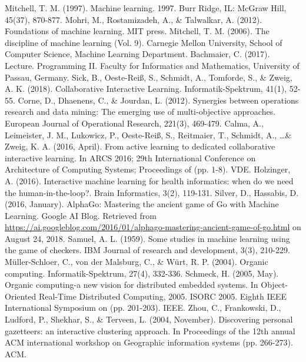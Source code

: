 \documentclass[conference]{IEEEtran}
\begin{document}
\begin{thebibliography}{1}
    Mitchell, T. M. (1997). Machine learning. 1997. Burr Ridge, IL: McGraw Hill, 45(37), 870-877.
    Mohri, M., Rostamizadeh, A., \& Talwalkar, A. (2012). Foundations of machine learning. MIT press.
    Mitchell, T. M. (2006). The discipline of machine learning (Vol. 9). Carnegie Mellon University, School of Computer Science, Machine Learning Department.
    Bachmaier, C. (2017). Lecture. Programming II\@. Faculty for Informatics and Mathematics, University of Passau, Germany.
    Sick, B., Oeste-Rei{\ss}, S., Schmidt, A., Tomforde, S., \& Zweig, A. K. (2018). Collaborative Interactive Learning. Informatik-Spektrum, 41(1), 52-55.
    Corne, D., Dhaenens, C., \& Jourdan, L. (2012). Synergies between operations research and data mining: The emerging use of multi-objective approaches. European Journal of Operational Research, 221(3), 469-479.
    Calma, A., Leimeister, J. M., Lukowicz, P., Oeste-Rei{\ss}, S., Reitmaier, T., Schmidt, A., \dots \& Zweig, K. A. (2016, April). From active learning to dedicated collaborative interactive learning. In ARCS 2016; 29th International Conference on Architecture of Computing Systems; Proceedings of (pp. 1-8). VDE.
    Holzinger, A. (2016). Interactive machine learning for health informatics: when do we need the human-in-the-loop?. Brain Informatics, 3(2), 119-131.
    Silver, D., Hassabis, D. (2016, January). AlphaGo: Mastering the ancient game of Go with Machine Learning. Google AI Blog. Retrieved from \url{https://ai.googleblog.com/2016/01/alphago-mastering-ancient-game-of-go.html} on August 24, 2018. 
    Samuel, A. L. (1959). Some studies in machine learning using the game of checkers. IBM Journal of research and development, 3(3), 210-229.
    M{\"u}ller-Schloer, C., von der Malsburg, C., \& W{\"u}rt, R. P. (2004). Organic computing. Informatik-Spektrum, 27(4), 332-336.
    Schmeck, H. (2005, May). Organic computing-a new vision for distributed embedded systems. In Object-Oriented Real-Time Distributed Computing, 2005. ISORC 2005. Eighth IEEE International Symposium on (pp. 201-203). IEEE.
    Zhou, C., Frankowski, D., Ludford, P., Shekhar, S., \& Terveen, L. (2004, November). Discovering personal gazetteers: an interactive clustering approach. In Proceedings of the 12th annual ACM international workshop on Geographic information systems (pp. 266-273). ACM.

\end{thebibliography}
\end{document}
